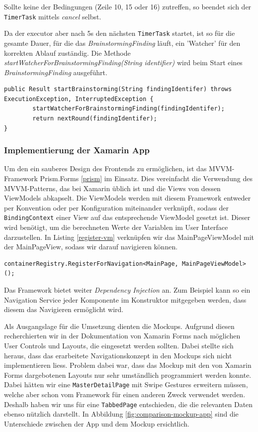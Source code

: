 Sollte keine der Bedingungen (Zeile 10, 15 oder 16) zutreffen, so beendet sich der \texttt{TimerTask} mittels \textit{cancel} selbst. 

Da der executor aber nach 5s den nächsten \texttt{TimerTask} startet, ist so für die gesamte Dauer, für die das \textit{BrainstormingFinding} läuft, ein 'Watcher' für den korrekten Ablauf zuständig. Die Methode \textit{startWatcherForBrainstormingFinding(String identifier)} wird beim Start eines \textit{BrainstormingFinding} ausgeführt.

\begin{lstlisting}
public Result startBrainstorming(String findingIdentifer) throws ExecutionException, InterruptedException {
        startWatcherForBrainstormingFinding(findingIdentifer);
        return nextRound(findingIdentifer);
}
\end{lstlisting}

\subsubsection{Implementierung der Xamarin App}
Um den ein sauberes Design des Frontends zu ermöglichen, ist das MVVM\--Framework Prism.Forms \ref{prism} im Einsatz. Dies vereinfacht die Verwendung des MVVM-Patterns, das bei Xamarin üblich ist und die Views von dessen ViewModels abkapselt. Die ViewModels werden mit diesem Framework entweder per Konvention oder per Konfiguration miteinander verknüpft, sodass der \texttt{BindingContext} einer View auf das entsprechende ViewModel gesetzt ist. Dieser wird benötigt, um die berechneten Werte der Variablen im User Interface darzustellen. In Listing \ref{register-vm} verknüpfen wir das MainPageViewModel mit der MainPageView, sodass wir darauf navigieren können. 

\begin{lstlisting}[label=register-vm,caption=Verknüpfung von View mit ViewModel in Prism.Forms]
containerRegistry.RegisterForNavigation<MainPage, MainPageViewModel>();
\end{lstlisting}

Das Framework bietet weiter \textit{Dependency Injection} an. Zum Beispiel kann so ein Navigation Service jeder Komponente im Konstruktor mitgegeben werden, dass diesem das Navigieren ermöglicht wird. 

Als Ausgangslage für die Umsetzung dienten die Mockups. Aufgrund diesen recherchierten wir in der Dokumentation von Xamarin Forms nach möglichen User Controls und Layouts, die eingesetzt werden sollten. Dabei stellte sich heraus, dass das erarbeitete Navigationskonzept in den Mockups sich nicht implementieren liess. Problem dabei war, dass das Mockup mit den von Xamarin Forms dargebotenen Layouts nur sehr umständlich programmiert werden konnte. Dabei hätten wir eine \texttt{MasterDetailPage} mit Swipe Gestures erweitern müssen, welche aber schon vom Framework für einen anderen Zweck verwendet werden. Deshalb haben wir uns für eine \texttt{TabbedPage} entschieden, die die relevanten Daten ebenso nützlich darstellt. In Abbildung \ref{fig:comparison-mockup-app} sind die Unterschiede zwischen  der App und dem Mockup ersichtlich.

